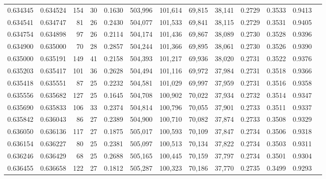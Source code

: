 \begin{tabular}{rrrrrrrrrrrrr}
0.634345 & 0.634524 &    154 &    30 &                                     0.1630 & 503,996 & 101,614 &  69,815 &  38,141 & 0.2729 & 0.3533 & 0.9413 \\
0.634541 & 0.634747 &     81 &    26 &                                     0.2430 & 504,077 & 101,533 &  69,841 &  38,115 & 0.2729 & 0.3531 & 0.9405 \\
0.634754 & 0.634898 &     97 &    26 &                                     0.2114 & 504,174 & 101,436 &  69,867 &  38,089 & 0.2730 & 0.3528 & 0.9396 \\
0.634900 & 0.635000 &     70 &    28 &                                     0.2857 & 504,244 & 101,366 &  69,895 &  38,061 & 0.2730 & 0.3526 & 0.9390 \\
0.635000 & 0.635191 &    149 &    41 &                                     0.2158 & 504,393 & 101,217 &  69,936 &  38,020 & 0.2731 & 0.3522 & 0.9376 \\
0.635203 & 0.635417 &    101 &    36 &                                     0.2628 & 504,494 & 101,116 &  69,972 &  37,984 & 0.2731 & 0.3518 & 0.9366 \\
0.635418 & 0.635551 &     87 &    25 &                                     0.2232 & 504,581 & 101,029 &  69,997 &  37,959 & 0.2731 & 0.3516 & 0.9358 \\
0.635556 & 0.635682 &    127 &    25 &                                     0.1645 & 504,708 & 100,902 &  70,022 &  37,934 & 0.2732 & 0.3514 & 0.9347 \\
0.635690 & 0.635833 &    106 &    33 &                                     0.2374 & 504,814 & 100,796 &  70,055 &  37,901 & 0.2733 & 0.3511 & 0.9337 \\
0.635842 & 0.636043 &     86 &    27 &                                     0.2389 & 504,900 & 100,710 &  70,082 &  37,874 & 0.2733 & 0.3508 & 0.9329 \\
0.636050 & 0.636136 &    117 &    27 &                                     0.1875 & 505,017 & 100,593 &  70,109 &  37,847 & 0.2734 & 0.3506 & 0.9318 \\
0.636154 & 0.636227 &     80 &    25 &                                     0.2381 & 505,097 & 100,513 &  70,134 &  37,822 & 0.2734 & 0.3503 & 0.9311 \\
0.636246 & 0.636429 &     68 &    25 &                                     0.2688 & 505,165 & 100,445 &  70,159 &  37,797 & 0.2734 & 0.3501 & 0.9304 \\
0.636455 & 0.636658 &    122 &    27 &                                     0.1812 & 505,287 & 100,323 &  70,186 &  37,770 & 0.2735 & 0.3499 & 0.9293 \\

\end{tabular}
